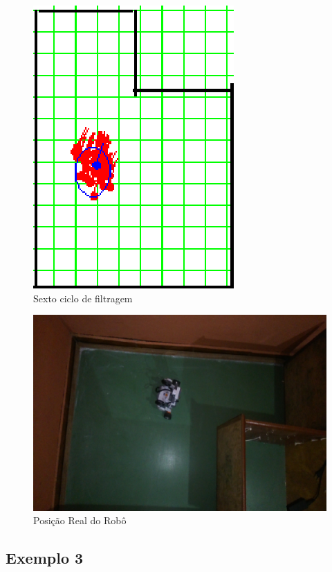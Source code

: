 \begin{figure}[H]
  \centering
  \includegraphics[scale=1]{figuras/cen2_ex2/7.eps}
  \caption[Sexto Ciclo de Filtragem]{Sexto ciclo de filtragem}
  \label{img:cen2_ex2_7}
\end{figure}

\begin{figure}[H]
  \centering
  \includegraphics[scale=1]{figuras/cen2_ex2/real.eps}
  \caption[Posição Real do Robô]{Posição Real do Robô}
  \label{img:cen2_ex2_real}
\end{figure}

\subsection{Exemplo 3}

